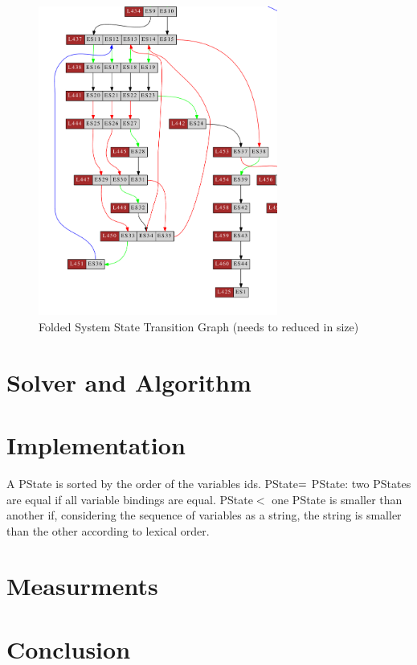 \begin{figure}[t]
\centering
\includegraphics[width=0.7\textwidth]{gfx/basictest10f_transitiongraph2.pdf}
\caption{Folded System State Transition Graph (needs to reduced in size)}
\end{figure}

\clearpage

\section{Solver and Algorithm}
\label{section-algorithm}


\section{Implementation}
\label{section-implementation}


A PState is sorted by the order of the variables ids.
PState$=$ PState: two PStates are equal if all variable bindings are equal.
PState$<$ one PState is smaller than another if, considering the sequence of variables as a string, the string is smaller than the other according to lexical order.

\section{Measurments}


\section{Conclusion}

